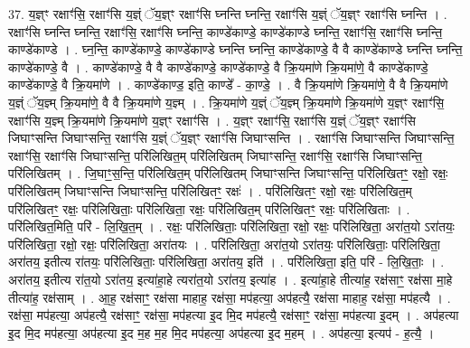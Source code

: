 \documentclass[17pt]{extarticle}
\begin{document}
37. य॒ज्ञ्ꣳ रक्षाꣳ॑सि॒ रक्षाꣳ॑सि य॒ज्ञ्ं ॅय॒ज्ञ्ꣳ रक्षाꣳ॑सि घ्नन्ति घ्नन्ति॒ रक्षाꣳ॑सि य॒ज्ञ्ं ॅय॒ज्ञ्ꣳ रक्षाꣳ॑सि घ्नन्ति । . रक्षाꣳ॑सि घ्नन्ति घ्नन्ति॒ रक्षाꣳ॑सि॒ रक्षाꣳ॑सि घ्नन्ति॒ काण्डे॑काण्डे॒ काण्डे॑काण्डे घ्नन्ति॒ रक्षाꣳ॑सि॒ रक्षाꣳ॑सि घ्नन्ति॒ काण्डे॑काण्डे । . घ्न॒न्ति॒ काण्डे॑काण्डे॒ काण्डे॑काण्डे घ्नन्ति घ्नन्ति॒ काण्डे॑काण्डे॒ वै वै काण्डे॑काण्डे घ्नन्ति घ्नन्ति॒ काण्डे॑काण्डे॒ वै । . काण्डे॑काण्डे॒ वै वै काण्डे॑काण्डे॒ काण्डे॑काण्डे॒ वै क्रि॒यमा॑णे क्रि॒यमा॑णे॒ वै काण्डे॑काण्डे॒ काण्डे॑काण्डे॒ वै क्रि॒यमा॑णे । . काण्डे॑काण्ड॒ इति॒ काण्डे᳚ - का॒ण्डे॒ । . वै क्रि॒यमा॑णे क्रि॒यमा॑णे॒ वै वै क्रि॒यमा॑णे य॒ज्ञ्ं ॅय॒ज्ञ्म् क्रि॒यमा॑णे॒ वै वै क्रि॒यमा॑णे य॒ज्ञ्म् । . क्रि॒यमा॑णे य॒ज्ञ्ं ॅय॒ज्ञ्म् क्रि॒यमा॑णे क्रि॒यमा॑णे य॒ज्ञ्ꣳ रक्षाꣳ॑सि॒ रक्षाꣳ॑सि य॒ज्ञ्म् क्रि॒यमा॑णे क्रि॒यमा॑णे य॒ज्ञ्ꣳ रक्षाꣳ॑सि । . य॒ज्ञ्ꣳ रक्षाꣳ॑सि॒ रक्षाꣳ॑सि य॒ज्ञ्ं ॅय॒ज्ञ्ꣳ रक्षाꣳ॑सि जिघाꣳसन्ति जिघाꣳसन्ति॒ रक्षाꣳ॑सि य॒ज्ञ्ं ॅय॒ज्ञ्ꣳ रक्षाꣳ॑सि जिघाꣳसन्ति । . रक्षाꣳ॑सि जिघाꣳसन्ति जिघाꣳसन्ति॒ रक्षाꣳ॑सि॒ रक्षाꣳ॑सि जिघाꣳसन्ति॒ परि॑लिखित॒म् परि॑लिखितम् जिघाꣳसन्ति॒ रक्षाꣳ॑सि॒ रक्षाꣳ॑सि जिघाꣳसन्ति॒ परि॑लिखितम् । . जि॒घाꣳ॒॒स॒न्ति॒ परि॑लिखित॒म् परि॑लिखितम् जिघाꣳसन्ति जिघाꣳसन्ति॒ परि॑लिखितꣳ॒॒ रक्षो॒ रक्षः॒ परि॑लिखितम् जिघाꣳसन्ति जिघाꣳसन्ति॒ परि॑लिखितꣳ॒॒ रक्षः॑ । . परि॑लिखितꣳ॒॒ रक्षो॒ रक्षः॒ परि॑लिखित॒म् परि॑लिखितꣳ॒॒ रक्षः॒ परि॑लिखिताः॒ परि॑लिखिता॒ रक्षः॒ परि॑लिखित॒म् परि॑लिखितꣳ॒॒ रक्षः॒ परि॑लिखिताः । . परि॑लिखित॒मिति॒ परि॑ - लि॒खि॒त॒म् । . रक्षः॒ परि॑लिखिताः॒ परि॑लिखिता॒ रक्षो॒ रक्षः॒ परि॑लिखिता॒ अरा॑त॒यो ऽरा॑तयः॒ परि॑लिखिता॒ रक्षो॒ रक्षः॒ परि॑लिखिता॒ अरा॑तयः । . परि॑लिखिता॒ अरा॑त॒यो ऽरा॑तयः॒ परि॑लिखिताः॒ परि॑लिखिता॒ अरा॑तय॒ इतीत्य रा॑तयः॒ परि॑लिखिताः॒ परि॑लिखिता॒ अरा॑तय॒ इति॑ । . परि॑लिखिता॒ इति॒ परि॑ - लि॒खि॒ताः॒ । . अरा॑तय॒ इतीत्य रा॑त॒यो ऽरा॑तय॒ इत्या॑हा॒हे त्यरा॑त॒यो ऽरा॑तय॒ इत्या॑ह । . इत्या॑हा॒हे तीत्या॑ह॒ रक्ष॑साꣳ॒॒ रक्ष॑सा मा॒हे तीत्या॑ह॒ रक्ष॑साम् । . आ॒ह॒ रक्ष॑साꣳ॒॒ रक्ष॑सा माहाह॒ रक्ष॑सा॒ मप॑हत्या॒ अप॑हत्यै॒ रक्ष॑सा माहाह॒ रक्ष॑सा॒ मप॑हत्यै । . रक्ष॑सा॒ मप॑हत्या॒ अप॑हत्यै॒ रक्ष॑साꣳ॒॒ रक्ष॑सा॒ मप॑हत्या इ॒द मि॒द मप॑हत्यै॒ रक्ष॑साꣳ॒॒ रक्ष॑सा॒ मप॑हत्या इ॒दम् । . अप॑हत्या इ॒द मि॒द मप॑हत्या॒ अप॑हत्या इ॒द म॒ह म॒ह मि॒द मप॑हत्या॒ अप॑हत्या इ॒द म॒हम् । . अप॑हत्या॒ इत्यप॑ - ह॒त्यै॒ । \newline
\pagebreak
{}
\end{document}
